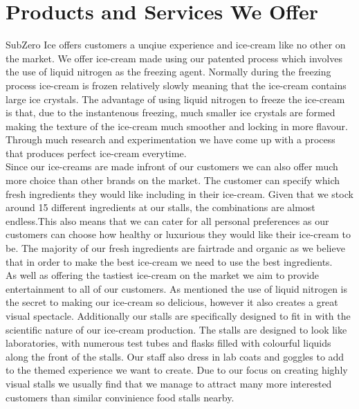 \documentclass{article}
\begin{document}
\section{Products and Services We Offer}

  SubZero Ice offers customers a unqiue experience and ice-cream like no other on the market. We offer ice-cream made using our patented process which involves the use of liquid nitrogen as the freezing agent. Normally during the freezing process ice-cream is frozen relatively slowly meaning that the ice-cream contains large ice crystals. The advantage of using liquid nitrogen to freeze the ice-cream is that, due to the instantenous freezing, much smaller ice crystals are formed making the texture of the ice-cream much smoother and locking in more flavour. Through much research and experimentation we have come up with a process that produces perfect ice-cream everytime. \\

  Since our ice-creams are made infront of our customers we can also offer much more choice than other brands on the market. The customer can specify which fresh ingredients they would like including in their ice-cream. Given that we stock around 15 different ingredients at our stalls, the combinations are almost endless.This also means that we can cater for all personal preferences as our customers can choose how healthy or luxurious they would like their ice-cream to be. The majority of our fresh ingredients are fairtrade and organic as we believe that in order to make the best ice-cream we need to use the best ingredients. \\

  As well as offering the tastiest ice-cream on the market we aim to provide entertainment to all of our customers. As mentioned the use of liquid nitrogen is the secret to making our ice-cream so delicious, however it also creates a great visual spectacle. Additionally our stalls are specifically designed to fit in with the scientific nature of our ice-cream production. The stalls are designed to look like laboratories, with numerous test tubes and flasks filled with colourful liquids along the front of the stalls. Our staff also dress in lab coats and goggles to add to the themed experience we want to create. Due to our focus on creating highly visual stalls we usually find that we manage to attract many more interested customers than similar convinience food stalls nearby. \\
  
\end{document}

